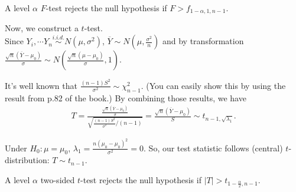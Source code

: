 A level $\alpha$ $F$-test rejects the null hypothesis if  $F > f_{1-\alpha, 1, n-1}$.\\
\vspace{\baselineskip}


Now, we construct a $t$-test.\\
Since $Y_{i}, \cdots Y_{n} \stackrel{i.i.d.}{\sim} N(\mu, \sigma^2)$, $\overline{Y} \sim N\left(\mu, \frac{\sigma^2}{n} \right)$ and by transformation $\frac{\sqrt{n}(\overline{Y} -\mu_{0})}{\sigma} \sim N\left(\frac{\sqrt{n}(\mu -\mu_{0})}{\sigma}, 1\right)$.

It's well known that $\frac{(n-1)S^2}{\sigma^2} \sim \chi_{n-1}^2$. (You can easily show this by using the result from p.82 of the book.) By combining those results, we have
\begin{align*}
T = \frac{\frac{\sqrt{n}(\overline{Y} -\mu_{0})}{\sigma}}{\sqrt{\frac{(n-1)S^2}{\sigma^2}/(n-1)}} = \frac{\sqrt{n}(\overline{Y} - \mu_{0})}{S}  \sim t_{n-1, \sqrt{\lambda_{1}}}.
\end{align*}

Under $H_{0}: \mu = \mu_{0}$, $\lambda_{1} = \frac{n(\mu_{0} - \mu_{0})^2}{\sigma^2} = 0$. So, our test statistic follows (central) $t$-distribution: $T \sim t_{n-1}$.

A level $\alpha$ two-sided $t$-test rejects the null hypothesis if  $|T| > t_{1-\frac{\alpha}{2}, n-1}$.
